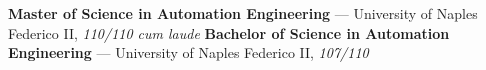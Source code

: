 
\begin{scholarship}
					{\textbf{Master of Science in Automation Engineering} --- University of Naples Federico II, \emph{110/110 cum laude}}
					{\textbf{Bachelor of Science in Automation Engineering} --- University of Naples Federico II, \emph{107/110}}
\end{scholarship}
